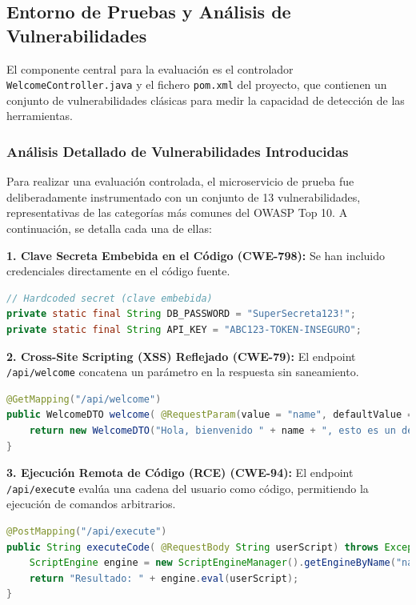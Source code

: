 \subsection{Entorno de Pruebas y Análisis de Vulnerabilidades}

El componente central para la evaluación es el controlador \texttt{WelcomeController.java} y el fichero \texttt{pom.xml} del proyecto, que contienen un conjunto de vulnerabilidades clásicas para medir la capacidad de detección de las herramientas.

\subsubsection{Análisis Detallado de Vulnerabilidades Introducidas}

Para realizar una evaluación controlada, el microservicio de prueba fue deliberadamente instrumentado con un conjunto de 13 vulnerabilidades, representativas de las categorías más comunes del OWASP Top 10. A continuación, se detalla cada una de ellas:

\textbf{1. Clave Secreta Embebida en el Código (CWE-798):} Se han incluido credenciales directamente en el código fuente.
\begin{lstlisting}[language=java, caption={Claves secretas hardcodeadas.}]
// Hardcoded secret (clave embebida)
private static final String DB_PASSWORD = "SuperSecreta123!";
private static final String API_KEY = "ABC123-TOKEN-INSEGURO";
\end{lstlisting}

\textbf{2. Cross-Site Scripting (XSS) Reflejado (CWE-79):} El endpoint \texttt{/api/welcome} concatena un parámetro en la respuesta sin saneamiento.
\begin{lstlisting}[language=java, caption={Código vulnerable a XSS.}]
@GetMapping("/api/welcome")
public WelcomeDTO welcome( @RequestParam(value = "name", defaultValue = "...") String name) {
    return new WelcomeDTO("Hola, bienvenido " + name + ", esto es un demo");
}
\end{lstlisting}

\textbf{3. Ejecución Remota de Código (RCE) (CWE-94):} El endpoint \texttt{/api/execute} evalúa una cadena del usuario como código, permitiendo la ejecución de comandos arbitrarios.
\begin{lstlisting}[language=java, caption={Código vulnerable a RCE.}]
@PostMapping("/api/execute")
public String executeCode( @RequestBody String userScript) throws Exception {
    ScriptEngine engine = new ScriptEngineManager().getEngineByName("nashorn");
    return "Resultado: " + engine.eval(userScript);
}
\end{lstlisting}

